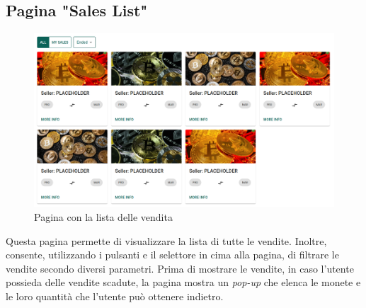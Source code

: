 \documentclass[a4paper]{article}
\begin{document}
        \subsection{Pagina "Sales List"}
        \begin{figure}[H]
          \includegraphics[width=\textwidth]{salesList.png}
          \caption{Pagina con la lista delle vendita}
          \centering
          \label{fig:salesList}
        \end{figure}
        Questa pagina permette di visualizzare la lista di tutte le vendite. Inoltre, consente, utilizzando i pulsanti e il selettore in cima alla pagina, di filtrare le vendite secondo diversi parametri.
        Prima di mostrare le vendite, in caso l'utente possieda delle vendite scadute, la pagina mostra un \emph{pop-up} che elenca le monete e le loro quantità che l'utente può ottenere indietro.
\end{document}
